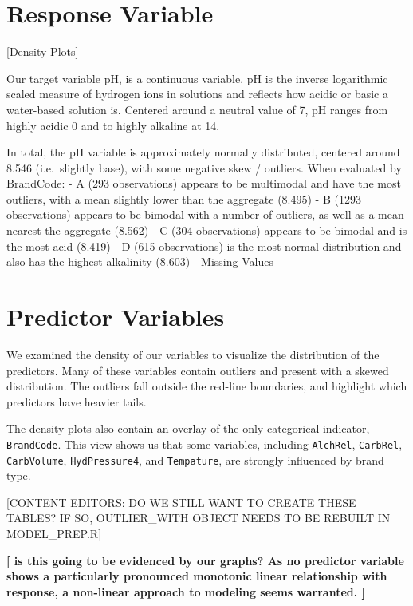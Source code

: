 \documentclass[]{report}
\begin{document}
\hypertarget{response-variable}{%
\section{Response Variable}\label{response-variable}}

{[}Density Plots{]}

Our target variable pH, is a continuous variable. pH is the inverse
logarithmic scaled measure of hydrogen ions in solutions and reflects
how acidic or basic a water-based solution is. Centered around a neutral
value of 7, pH ranges from highly acidic 0 and to highly alkaline at 14.

In total, the pH variable is approximately normally distributed,
centered around 8.546 (i.e.~slightly base), with some negative skew /
outliers. When evaluated by BrandCode: - A (293 observations) appears to
be multimodal and have the most outliers, with a mean slightly lower
than the aggregate (8.495) - B (1293 observations) appears to be bimodal
with a number of outliers, as well as a mean nearest the aggregate
(8.562) - C (304 observations) appears to be bimodal and is the most
acid (8.419) - D (615 observations) is the most normal distribution and
also has the highest alkalinity (8.603) - Missing Values

\hypertarget{predictor-variables}{%
\section{Predictor Variables}\label{predictor-variables}}

We examined the density of our variables to visualize the distribution
of the predictors. Many of these variables contain outliers and present
with a skewed distribution. The outliers fall outside the red-line
boundaries, and highlight which predictors have heavier tails.

The density plots also contain an overlay of the only categorical
indicator, \texttt{BrandCode}. This view shows us that some variables,
including \texttt{AlchRel}, \texttt{CarbRel}, \texttt{CarbVolume},
\texttt{HydPressure4}, and \texttt{Tempature}, are strongly influenced
by brand type.

{[}CONTENT EDITORS: DO WE STILL WANT TO CREATE THESE TABLES? IF SO,
OUTLIER\_WITH OBJECT NEEDS TO BE REBUILT IN MODEL\_PREP.R{]}

\textbf{{[} is this going to be evidenced by our graphs? As no predictor
variable shows a particularly pronounced monotonic linear relationship
with response, a non-linear approach to modeling seems warranted. {]}}
\end{document}
